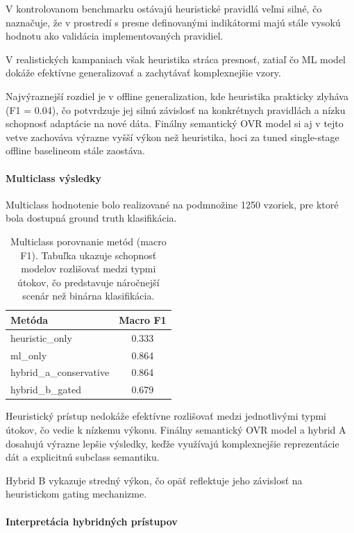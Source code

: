 \documentclass[conference]{IEEEtran}
\begin{document}
V kontrolovanom benchmarku ostávajú heuristické pravidlá veľmi silné,
čo naznačuje, že v prostredí s presne definovanými indikátormi majú
stále vysokú hodnotu ako validácia implementovaných pravidiel.

V realistických kampaniach však heuristika stráca presnosť,
zatiaľ čo ML model dokáže efektívne generalizovať a zachytávať
komplexnejšie vzory.

Najvýraznejší rozdiel je v offline generalization,
kde heuristika prakticky zlyháva (F1 = 0.04),
čo potvrdzuje jej silnú závislosť na konkrétnych pravidlách
a nízku schopnosť adaptácie na nové dáta. Finálny semantický OVR model
si aj v tejto vetve zachováva výrazne vyšší výkon než heuristika,
hoci za tuned single-stage offline baselineom stále zaostáva.

\paragraph{Multiclass výsledky}

Multiclass hodnotenie bolo realizované na podmnožine 1250 vzoriek,
pre ktoré bola dostupná ground truth klasifikácia.

\begin{table}[H]
\centering
\begin{tabular}{lc}
\hline
Metóda & Macro F1 \\
\hline
heuristic\_only & 0.333 \\
ml\_only & 0.864 \\
hybrid\_a\_conservative & 0.864 \\
hybrid\_b\_gated & 0.679 \\
\hline
\end{tabular}
\caption{Multiclass porovnanie metód (macro F1). Tabuľka ukazuje schopnosť modelov rozlišovať medzi typmi útokov, čo predstavuje náročnejší scenár než binárna klasifikácia.}
\end{table}

Heuristický prístup nedokáže efektívne rozlišovať medzi jednotlivými typmi útokov,
čo vedie k nízkemu výkonu. Finálny semantický OVR model a hybrid A dosahujú výrazne
lepšie výsledky, keďže využívajú komplexnejšie reprezentácie dát a explicitnú subclass
semantiku.

Hybrid B vykazuje stredný výkon, čo opäť reflektuje jeho závislosť
na heuristickom gating mechanizme.

\paragraph{Interpretácia hybridných prístupov}
\end{document}
